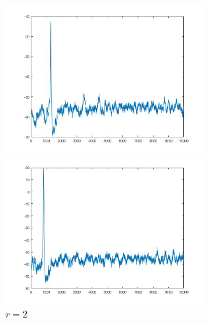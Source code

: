 \documentclass[
bachelor,
nofont, %
pdflinks,
]{xjtuthesis}
\begin{document}
\begin{figure}[!ht]
\begin{minipage}[!ht]{0.5\linewidth}
\centering
\includegraphics[width=3.0in]{p10r1_2.jpg}
\caption{$r=1$}
\end{minipage}%
\begin{minipage}[!ht]{0.5\linewidth}
\centering
\includegraphics[width=3.0in]{p10r2_2.jpg}
\caption{$r=2$}
\end{minipage}
\end{figure}

\xjtuendcontent



\xjtuappendix
\end{document}
